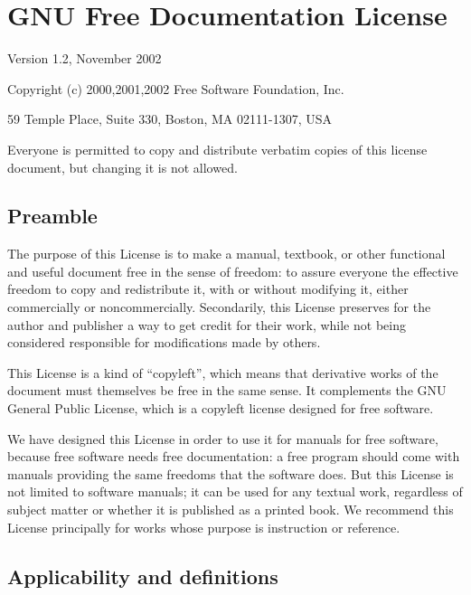 %

\section{GNU Free Documentation License\label{sec:GFDL} }

Version 1.2, November 2002

Copyright (c) 2000,2001,2002 Free Software Foundation, Inc. 

59 Temple Place, Suite 330, Boston, MA 02111-1307, USA

Everyone is permitted to copy and distribute verbatim copies of this
license document, but changing it is not allowed.


\subsection{Preamble}

The purpose of this License is to make a manual, textbook, or other
functional and useful document free in the sense of freedom: to assure
everyone the effective freedom to copy and redistribute it, with or
without modifying it, either commercially or noncommercially. Secondarily,
this License preserves for the author and publisher a way to get credit
for their work, while not being considered responsible for modifications
made by others.

This License is a kind of ``copyleft'', which means that derivative
works of the document must themselves be free in the same sense. It
complements the GNU General Public License, which is a copyleft license
designed for free software.

We have designed this License in order to use it for manuals for free
software, because free software needs free documentation: a free program
should come with manuals providing the same freedoms that the software
does. But this License is not limited to software manuals; it can
be used for any textual work, regardless of subject matter or whether
it is published as a printed book. We recommend this License principally
for works whose purpose is instruction or reference.

\subsection{Applicability and definitions\label{subsec:1Applicability-and-definitions}}

